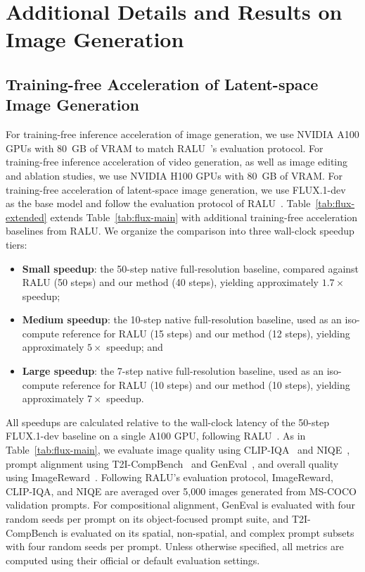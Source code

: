 \section{Additional Details and Results on Image Generation}
\label{sec:image_generation}


\subsection{Training-free Acceleration of Latent-space Image Generation}
\label{subsec:image_latent}

For training-free inference acceleration of image generation, we use NVIDIA A100 GPUs with 80~GB of VRAM to match RALU~\citep{ralu}'s evaluation protocol. For training-free inference acceleration of video generation, as well as image editing and ablation studies, we use NVIDIA H100 GPUs with 80~GB of VRAM. For training-free acceleration of latent-space image generation, we use FLUX.1-dev~\citep{black2024flux} as the base model and follow the evaluation protocol of RALU~\citep{ralu}. Table~\ref{tab:flux-extended} extends Table~\ref{tab:flux-main} with additional training-free acceleration baselines from RALU. We organize the comparison into three wall-clock speedup tiers:

\begin{itemize}
    \item \textbf{Small speedup}: the 50-step native full-resolution baseline, compared against RALU (50 steps) and our method (40 steps), yielding approximately $1.7\times$ speedup;
    \item \textbf{Medium speedup}: the 10-step native full-resolution baseline, used as an iso-compute reference for RALU (15 steps) and our method (12 steps), yielding approximately $5\times$ speedup; and
    \item \textbf{Large speedup}: the 7-step native full-resolution baseline, used as an iso-compute reference for RALU (10 steps) and our method (10 steps), yielding approximately $7\times$ speedup.
\end{itemize}
All speedups are calculated relative to the wall-clock latency of the 50-step FLUX.1-dev baseline on a single A100 GPU, following RALU~\citep{ralu}. As in Table~\ref{tab:flux-main}, we evaluate image quality using CLIP-IQA~\citep{wang2023clipiqa} and NIQE~\citep{mittal2013niqe}, prompt alignment using T2I-CompBench~\citep{t2icompbench} and GenEval~\citep{geneval}, and overall quality using ImageReward~\citep{imagereward}.
Following RALU's evaluation protocol, ImageReward, CLIP-IQA, and NIQE are averaged over 5,000 images generated from MS-COCO validation prompts. For compositional alignment, GenEval is evaluated with four random seeds per prompt on its object-focused prompt suite, and T2I-CompBench is evaluated on its spatial, non-spatial, and complex prompt subsets with four random seeds per prompt. Unless otherwise specified, all metrics are computed using their official or default evaluation settings.

